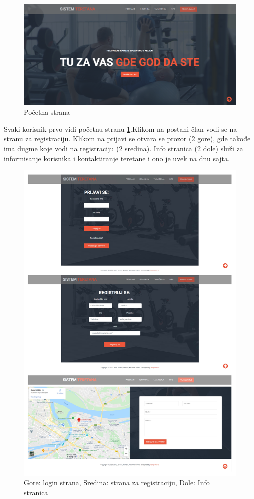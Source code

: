 \documentclass[../main.tex]{subfiles}
\begin{document}
\begin{figure}[!ht]
\begin{center}
\includegraphics[scale=0.30]{sections/korisnicki_interfejs/screenshots/pocetna.PNG}
\end{center}
\caption{Početna strana}
\label{fig:pocetna}
\end{figure}

Svaki korisnik prvo vidi početnu stranu \ref{fig:pocetna}.Klikom na postani član vodi se na stranu za registraciju. Klikom na prijavi se otvara se prozor (\ref{fig:loginIreg} gore), gde takođe ima dugme koje vodi na registraciju (\ref{fig:loginIreg} sredina). Info stranica (\ref{fig:loginIreg} dole) služi za informisanje korisnika i kontaktiranje teretane i ono je uvek na dnu sajta.

\begin{figure}[!ht]
\begin{center}
\includegraphics[scale=0.30]{sections/korisnicki_interfejs/screenshots/loginIregistracija.jpg}
\end{center}
\caption{Gore: login strana, Sredina: strana za registraciju, Dole: Info stranica}
\label{fig:loginIreg}
\end{figure}
\end{document}
